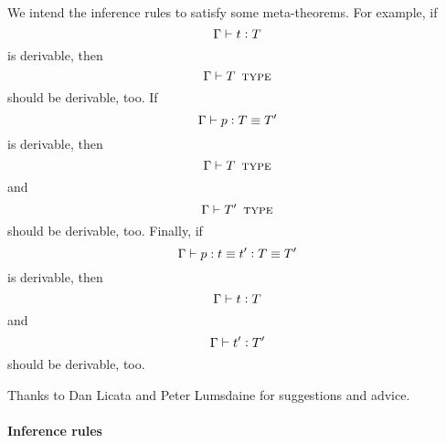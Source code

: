 \documentclass[11pt]{article}
\newcommand{\eqd}{\equiv}
\newcommand{\ccolon}{\vcentcolon}
\newcommand{\TYPE}{\mathop{\text{ \sc type}}}
\begin{document}
We intend the inference rules to satisfy some meta-theorems.  For example, if 
$$ \Gamma \vdash t \ccolon T  $$
is derivable, then
$$ \Gamma \vdash T \TYPE  $$
should be derivable, too.  If
$$ \Gamma \vdash p \ccolon T \eqd T'  $$
is derivable, then
$$ \Gamma \vdash T \TYPE  $$
and
$$ \Gamma \vdash T' \TYPE  $$
should be derivable, too.  Finally, if 
$$ \Gamma \vdash p : t \eqd t' \ccolon T \eqd T'  $$
is derivable, then
$$ \Gamma \vdash t \ccolon T  $$
and
$$ \Gamma \vdash t' \ccolon T'  $$
should be derivable, too.

Thanks to Dan Licata and Peter Lumsdaine for suggestions and advice.

\paragraph{Inference rules} 
\end{document}
